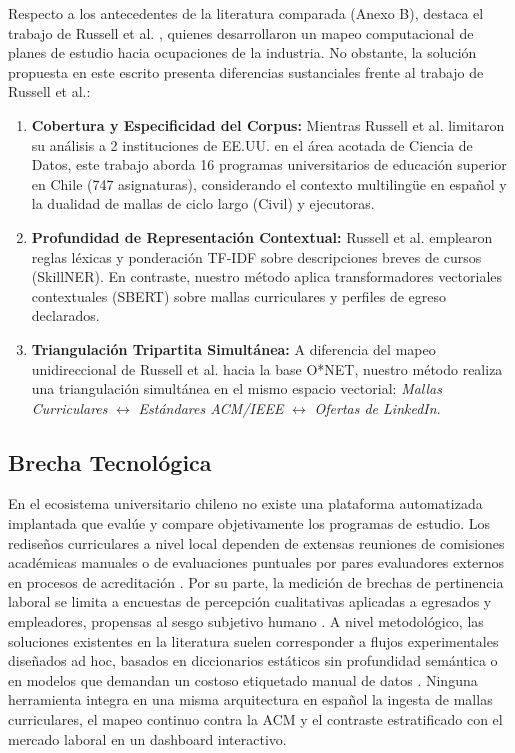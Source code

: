 Respecto a los antecedentes de la literatura comparada (Anexo B), destaca el trabajo de Russell et al. \citep{russell_e_mapping_2024}, quienes desarrollaron un mapeo computacional de planes de estudio hacia ocupaciones de la industria. No obstante, la solución propuesta en este escrito presenta diferencias sustanciales frente al trabajo de Russell et al.:
\begin{enumerate}[label=\alph*)]
	\item \textbf{Cobertura y Especificidad del Corpus:} Mientras Russell et al. limitaron su análisis a 2 instituciones de EE.UU. en el área acotada de Ciencia de Datos, este trabajo aborda 16 programas universitarios de educación superior en Chile (747 asignaturas), considerando el contexto multilingüe en español y la dualidad de mallas de ciclo largo (Civil) y ejecutoras.
	\item \textbf{Profundidad de Representación Contextual:} Russell et al. emplearon reglas léxicas y ponderación TF-IDF sobre descripciones breves de cursos (SkillNER). En contraste, nuestro método aplica transformadores vectoriales contextuales (SBERT) sobre mallas curriculares y perfiles de egreso declarados.
	\item \textbf{Triangulación Tripartita Simultánea:} A diferencia del mapeo unidireccional de Russell et al. hacia la base O*NET, nuestro método realiza una triangulación simultánea en el mismo espacio vectorial: \textit{Mallas Curriculares} $\leftrightarrow$ \textit{Estándares ACM/IEEE} $\leftrightarrow$ \textit{Ofertas de LinkedIn}.
\end{enumerate}

\subsection{Brecha Tecnológica}
\label{sec:technology_gap}

En el ecosistema universitario chileno no existe una plataforma automatizada implantada que evalúe y compare objetivamente los programas de estudio. Los rediseños curriculares a nivel local dependen de extensas reuniones de comisiones académicas manuales \citep{contreras_diseno_nodate} o de evaluaciones puntuales por pares evaluadores externos en procesos de acreditación \citep{diaz-quezada_rediseno_2019}. Por su parte, la medición de brechas de pertinencia laboral se limita a encuestas de percepción cualitativas aplicadas a egresados y empleadores, propensas al sesgo subjetivo humano \citep{latuz_pina_2024}. A nivel metodológico, las soluciones existentes en la literatura suelen corresponder a flujos experimentales diseñados ad hoc, basados en diccionarios estáticos sin profundidad semántica \citep{constantinov_preliminary_2015} o en modelos que demandan un costoso etiquetado manual de datos \citep{fan_identifying_2023}. Ninguna herramienta integra en una misma arquitectura en español la ingesta de mallas curriculares, el mapeo continuo contra la ACM y el contraste estratificado con el mercado laboral en un dashboard interactivo.

